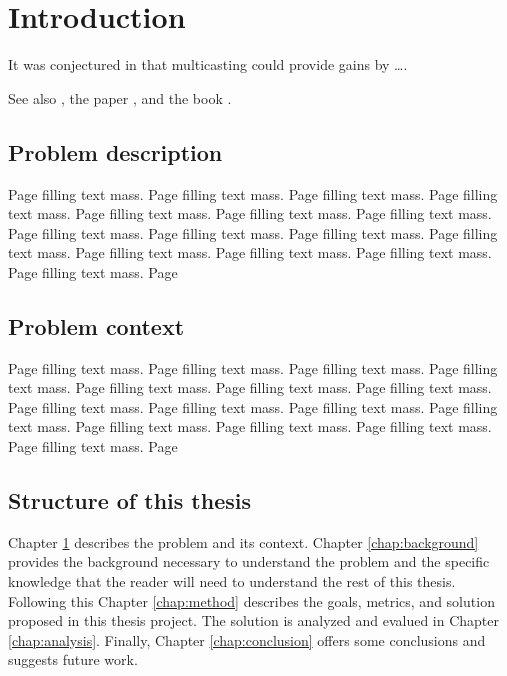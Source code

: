\documentclass[12pt,a4paper,twoside,openright]{book}
\begin{document}
\mainmatter
\setcounter{secnumdepth}{5} 
\chapter{Introduction}
\label{chap:introduction}

It was conjectured in \cite{john_ioannidis_coherent_1991} that multicasting
could provide gains by \ldots.

See also \cite{a_new_synchronization_protocol_for_sqlite_databases},
the paper \cite{anand_kannan_n-ary_2012}, 
and the book \cite{brent_s._baxter_standard_1982}.


\section{Problem description}
\label{sec:problem_description}

Page filling text mass. Page filling text mass. Page filling text mass. Page
filling text mass. Page filling text mass. Page filling text mass. Page
filling text mass. Page filling text mass. Page filling text mass. Page
filling text mass. Page filling text mass. Page filling text mass. Page
filling text mass. Page filling text mass. Page filling text mass. Page



\section{Problem context}
\label{sec:problem_context}

Page filling text mass. Page filling text mass. Page filling text mass. Page
filling text mass. Page filling text mass. Page filling text mass. Page
filling text mass. Page filling text mass. Page filling text mass. Page
filling text mass. Page filling text mass. Page filling text mass. Page
filling text mass. Page filling text mass. Page filling text mass. Page


\section{Structure of this thesis}
\label{sec:thesis_structure}

Chapter \ref{chap:introduction} describes the problem and its context.
Chapter \ref{chap:background} provides the background necessary to understand the
problem and the specific knowledge that the reader will need to understand the
rest of this thesis. Following this Chapter \ref{chap:method} describes the
goals, metrics, and solution proposed in this thesis project. The solution is
analyzed and evalued in Chapter \ref{chap:analysis}. Finally, Chapter
\ref{chap:conclusion} offers some conclusions and suggests future work.
\end{document}
